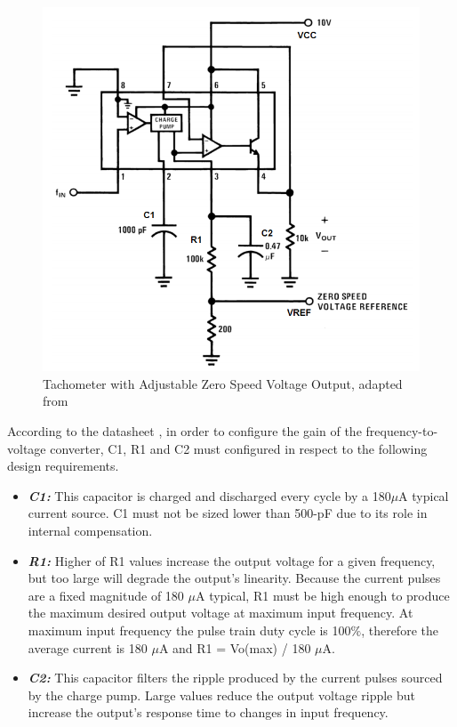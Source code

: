 			\begin{figure}[htbp]
				\centering
				\includegraphics[width=.8\textwidth]{figuras/fig-lm2907-minimum-component-tachometer.png}
				\caption{Tachometer with Adjustable Zero Speed Voltage Output, adapted from \cite{lm2907-minimum-component-tachometer}}
				\label{fig:lm2907-minimum-component-tachometer}
			\end{figure}

			According to the datasheet \cite{lm2907-datasheet}, in order to configure the gain of the frequency-to-voltage converter, C1, R1 and C2 must configured in respect to the following design requirements.

			\begin{itemize}
				\item\textbf{\textit{C1:}} This capacitor is charged and discharged every cycle by a 180$\mu$A typical current source. C1 must not be sized lower than 500-pF due to its role in internal compensation.\label{itm:lm2907-c1}
				\item\textbf{\textit{R1:}} Higher of R1 values increase the output voltage for a given frequency, but too large will degrade the output’s linearity. Because the current pulses are a fixed magnitude of 180 $\mu$A  typical, R1 must be high enough to produce the maximum desired output voltage at maximum input frequency. At maximum input frequency the pulse train duty cycle is 100$\%$, therefore the average current is 180 $\mu$A and R1 = Vo(max) / 180 $\mu$A.\label{itm:lm2907-r1}
				\item\textbf{\textit{C2:}} This capacitor filters the ripple produced by the current pulses sourced by the charge pump. Large values reduce the output voltage ripple but increase the output’s response time to changes in input frequency.\label{itm:lm2907-c2}
			\end{itemize}

